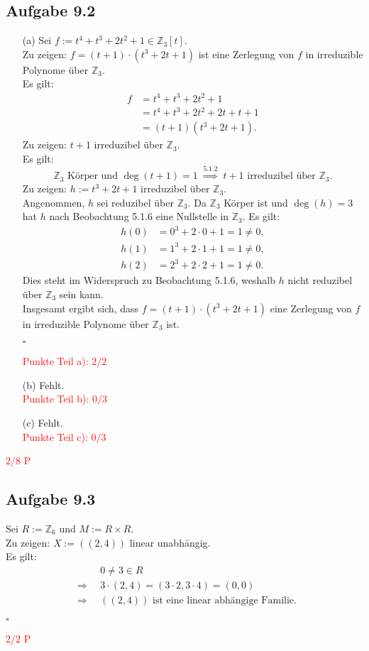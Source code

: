 \documentclass[12pt]{article}
\newcommand{\corr}[1]{\textcolor{red}{#1}}
\newcommand{\QED}{\begin{flushright} $\square$ \end{flushright}}
\newcommand{\df}{\enspace\Longrightarrow\enspace}
\newcommand{\grad}{\operatorname{deg}}
\begin{document}
\subsection*{Aufgabe 9.2}
\begin{enumerate}
	\item[(a)] Sei $f:=t^4+t^3+2t^2+1\in\mathbb{Z}_3[t]$. \\
	Zu zeigen: $f=(t+1)\cdot(t^3+2t+1)$ ist eine Zerlegung von $f$ in irreduzible Polynome über $\mathbb{Z}_3$. \\
	Es gilt:
	\begin{align*}
		f&=t^4+t^3+2t^2+1 \\
		&=t^4+t^3+2t^2+2t+t+1 \\
		&=(t+1)(t^3+2t+1).
	\end{align*}
	Zu zeigen: $t+1$ irreduzibel über $\mathbb{Z}_3$. \\
	Es gilt: $$\mathbb{Z}_3\text{ Körper und }\grad(t+1)=1\overset{5.1.2}{\df} t+1\text{ irreduzibel über }\mathbb{Z}_3.$$
	Zu zeigen: $h:=t^3+2t+1$ irreduzibel über $\mathbb{Z}_3$. \\
	Angenommen, $h$ sei reduzibel über $\mathbb{Z}_3$. Da $\mathbb{Z}_3$ Körper ist und $\grad(h)=3$ hat $h$ nach Beobachtung 5.1.6 eine Nullstelle in $\mathbb{Z}_3$. Es gilt:
	\begin{align*}
		h(0)&=0^3+2\cdot0+1=1\neq0, \\
		h(1)&=1^3+2\cdot1+1=1\neq0, \\
		h(2)&=2^3+2\cdot2+1=1\neq0.
	\end{align*}
	Dies steht im Widerspruch zu Beobachtung 5.1.6, weshalb $h$ nicht reduzibel über $\mathbb{Z}_3$ sein kann. \\
	Insgesamt ergibt sich, dass $f=(t+1)\cdot(t^3+2t+1)$ eine Zerlegung von $f$ in irreduzible Polynome über $\mathbb{Z}_3$ ist.
	\QED
\corr{Punkte Teil a): $2/2$}
	
	\item[(b)] Fehlt.\\
\corr{Punkte Teil b): $0/3$}
	\item[(c)] Fehlt.\\
\corr{Punkte Teil c): $0/3$}
\end{enumerate}
\corr{$2/8$ P}

\subsection*{Aufgabe 9.3}
Sei $R:=\mathbb{Z}_6$ und $M:=R\times R$. \\
Zu zeigen: $X:=((2,4))$ linear unabhängig. \\
Es gilt:
\begin{align*}
	&0\neq3\in R \\
	\df &3\cdot(2,4) = (3\cdot2,3\cdot4)=(0,0) \\
	\df &((2,4))\text{ ist eine linear abhängige Familie}.
\end{align*}
\QED
\corr{$2/2$ P}
\end{document}
